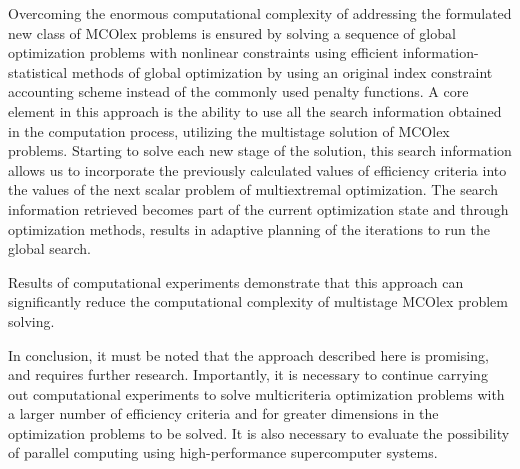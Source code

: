 \documentclass[smallextended]{svjour3}       %
\begin{document}
Overcoming the enormous computational complexity of addressing the formulated new class of MCOlex problems is ensured by solving a sequence of global optimization problems with nonlinear constraints using efficient information-statistical methods of global optimization by using an original index constraint accounting scheme instead of the commonly used penalty functions. A core element in this approach is the ability to use all the search information obtained in the computation process, utilizing the multistage solution of MCOlex problems. Starting to solve each new stage of the solution, this search information allows us to incorporate the previously calculated values of efficiency criteria into the values of the next scalar problem of multiextremal optimization. The search information retrieved becomes part of the current optimization state and through optimization methods, results in adaptive planning of the iterations to run the global search. 

Results of computational experiments demonstrate that this approach can significantly reduce the computational complexity of multistage MCOlex problem solving.

In conclusion, it must be noted that the approach described here is promising, and requires further research. Importantly, it is necessary to continue carrying out computational experiments to solve multicriteria optimization problems with a larger number of efficiency criteria and for greater dimensions in the optimization problems to be solved. It is also necessary to evaluate the possibility of parallel computing using high-performance supercomputer systems.
\end{document}
